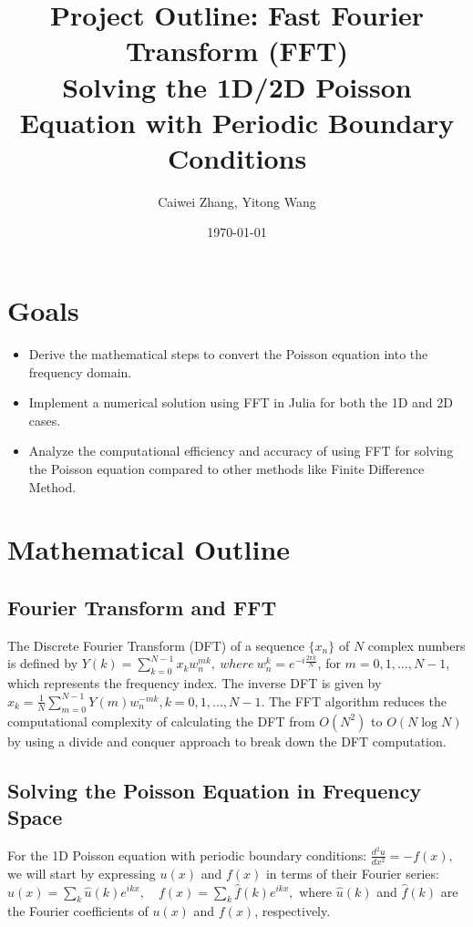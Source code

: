 \documentclass[11pt]{article}
\title{Project Outline: Fast Fourier Transform (FFT)\\ Solving the 1D/2D Poisson Equation with Periodic Boundary Conditions}
\author{Caiwei Zhang, Yitong Wang}
\date{\today}
\begin{document}
\maketitle
\doublespacing
\setlength{\parindent}{0pt}

\section*{Goals}
\begin{itemize}
    \item Derive the mathematical steps to convert the Poisson equation into the frequency domain.
    \item Implement a numerical solution using FFT in Julia for both the 1D and 2D cases.
    \item Analyze the computational efficiency and accuracy of using FFT for solving the Poisson equation compared to other methods like Finite Difference Method.
\end{itemize}

\section*{Mathematical Outline}

\subsection{Fourier Transform and FFT}

The Discrete Fourier Transform (DFT) of a sequence \( \{x_n\} \) of \( N \) complex numbers is defined by
\(
Y(k) = \sum_{k=0}^{N-1} x_k w_n^{mk}, \ where \ w_n^{k} = e^{-i \frac{2\pi k}{N}}
\), 
for \( m = 0, 1, \dots, N-1 \), which represents the frequency index. 
The inverse DFT is given by
\(
x_k = \frac{1}{N} \sum_{m=0}^{N-1} Y(m) w_n^{-mk},  k = 0,1, ..., N-1
\).
The FFT algorithm reduces the computational complexity of calculating the DFT from \( O(N^2) \) to \( O(N \log N) \)
by using a divide and conquer approach to break down the DFT computation.

\subsection{Solving the Poisson Equation in Frequency Space}
For the 1D Poisson equation with periodic boundary conditions:
\(
\frac{d^2 u}{dx^2} = -f(x),
\)
we will start by expressing \( u(x) \) and \( f(x) \) in terms of their Fourier series:
\(
u(x) = \sum_{k} \hat{u}(k) e^{i k x}, \quad f(x) = \sum_{k} \hat{f}(k) e^{i k x},
\)
where \( \hat{u}(k) \) and \( \hat{f}(k) \) are the Fourier coefficients of \( u(x) \) and \( f(x) \), respectively.
\end{document}
